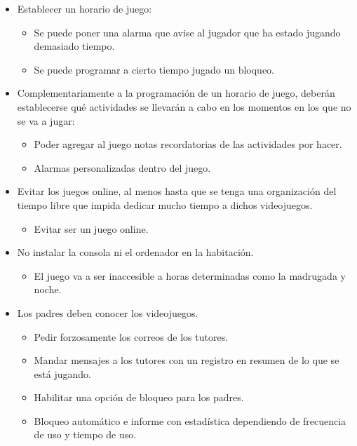 \begin{itemize}
	\item Establecer un horario de juego:
	\begin{itemize}
		\item Se puede poner una alarma que avise al jugador que ha estado jugando demasiado tiempo.
		\item Se puede programar a cierto tiempo jugado un bloqueo.
	\end{itemize}
	\item Complementariamente a la programación de un horario de juego, deberán establecerse qué actividades se llevarán a cabo en los momentos en los que no se va a jugar:
	\begin{itemize}
		\item Poder agregar al juego notas recordatorias de las actividades por hacer.
		\item Alarmas personalizadas dentro del juego.
	\end{itemize}
	\item Evitar los juegos online, al menos hasta que se tenga una organización del tiempo libre que impida dedicar mucho tiempo a dichos videojuegos.
	\begin{itemize}
		\item Evitar ser un juego online.
	\end{itemize}
	\item  No instalar la consola ni el ordenador en la habitación.
	\begin{itemize}
		\item El juego va a ser inaccesible a horas determinadas como la madrugada y noche.
	\end{itemize}
	\item Los padres deben conocer los videojuegos.
	\begin{itemize}
		\item Pedir forzosamente los correos de los tutores.
		\item Mandar mensajes a los tutores con un registro en resumen de lo que se está jugando.
		\item Habilitar una opción de bloqueo para los padres.
		\item Bloqueo automático e informe con estadística dependiendo de frecuencia de uso y tiempo de uso.
	\end{itemize}
\end{itemize}
